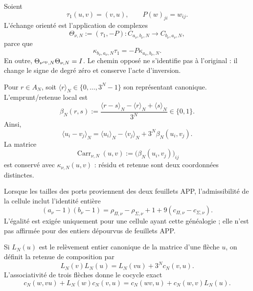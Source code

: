 Soient
\[
 \tau_1(u,v)=(v,u),
 \qquad
 P(w)_{ji}=w_{ij}.
\]
L'échange orienté est l'application de complexes
\begin{equation}\label{eq:pdfv2-coh-theta}
 \Theta_{\nu,N}:=(\tau_1,-P):
 C_{a_\nu,b_\nu,N}\longrightarrow C_{b_\nu,a_\nu,N},
\end{equation}
parce que
\begin{equation}\label{eq:pdfv2-coh-orientation}
 \kappa_{b_\nu,a_\nu,N}\tau_1
 =-P\kappa_{a_\nu,b_\nu,N}.
\end{equation}
En outre,
\(\Theta_{\nu^{\rm op},N}\Theta_{\nu,N}=I\). Le chemin opposé ne
s'identifie pas à l'original : il change le signe de degré zéro et conserve l'acte
d'inversion.

Pour \(r\in A_N\), soit
\(\langle r\rangle_N\in\{0,\ldots,3^N-1\}\) son représentant canonique.
L'emprunt/retenue local est
\begin{equation}\label{eq:pdfv2-coh-beta}
 \beta_N(r,s):=
 \frac{\langle r-s\rangle_N-\langle r\rangle_N+\langle s\rangle_N}
 {3^N}\in\{0,1\}.
\end{equation}
Ainsi,
\begin{equation}\label{eq:pdfv2-coh-carry-cell}
 \langle u_i-v_j\rangle_N
 =\langle u_i\rangle_N-\langle v_j\rangle_N
  +3^N\beta_N(u_i,v_j).
\end{equation}
La matrice
\[
 \operatorname{Carr}_{\nu,N}(u,v)
 :=\bigl(\beta_N(u_i,v_j)\bigr)_{ij}
\]
est conservé avec \(\kappa_{\nu,N}(u,v)\) : résidu et retenue sont deux
coordonnées distinctes.

Lorsque les tailles des ports proviennent des deux feuillets APP, l'admissibilité
de la cellule inclut l'identité entière
\begin{equation}\label{eq:pdfv2-coh-app-defect}
 (a_\nu-1)(b_\nu-1)
 =\rho_{\Pi,\nu}-\rho_{\Sigma,\nu}+1
  +9(c_{\Pi,\nu}-c_{\Sigma,\nu}).
\end{equation}
L'égalité est exigée uniquement pour une cellule ayant cette généalogie ; elle n'est pas affirmée
pour des entiers dépourvus de feuillets APP.

Si \(L_N(u)\) est le relèvement entier canonique de la matrice d'une flèche
\(u\), on définit la retenue de composition par
\begin{equation}\label{eq:pdfv2-coh-carry-composition}
 L_N(v)L_N(u)=L_N(vu)+3^N c_N(v,u).
\end{equation}
L'associativité de trois flèches donne le cocycle exact
\begin{equation}\label{eq:pdfv2-coh-carry-cocycle}
 c_N(w,vu)+L_N(w)c_N(v,u)
 =c_N(wv,u)+c_N(w,v)L_N(u).
\end{equation}

